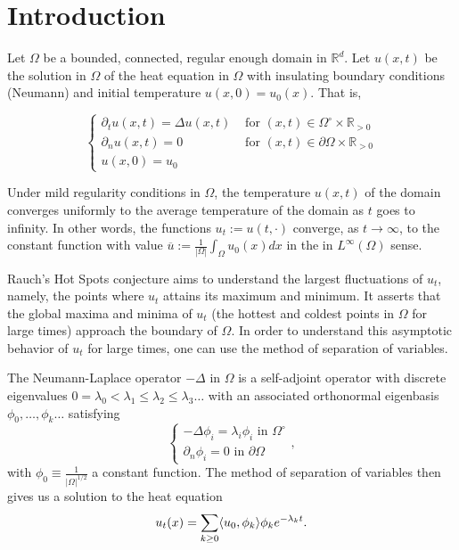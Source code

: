 \section{Introduction}

Let $\Omega$ be a bounded, connected, regular enough domain in $\mathbb R^d$. Let $u(x,t)$ be the solution in $\Omega$ of the heat equation in $\Omega$ with insulating boundary conditions (Neumann) and initial temperature $u(x,0)=u_0(x)$. That is,

\begin{equation}
    \begin{cases}
        \partial_t u(x,t) = \Delta u(x,t) & \text{ for } (x,t)\in \Omega^\circ\times \mathbb R_{>0}\\
        \partial_n u(x,t) = 0 &\text{ for } (x,t)\in \partial \Omega \times \mathbb R_{>0} \\
        u(x,0) = u_0
    \end{cases}
\end{equation}

Under mild regularity conditions in $\Omega$, the temperature $u(x,t)$ of the domain converges uniformly to the average temperature of the domain as $t$ goes to infinity. In other words, the functions $u_t:= u(t,\cdot)$ converge, as $t\to \infty$, to the constant function with value $\overline u:= \frac 1 {|\Omega|}\int_\Omega u_0(x) dx$ in the in $L^\infty(\Omega)$ sense.

Rauch's Hot Spots conjecture aims to understand the largest fluctuations of $u_t$, namely, the points where $u_t$ attains its maximum and minimum. It asserts that the global maxima and minima of $u_t$ (the hottest and coldest points in $\Omega$ for large times) approach the boundary of $\Omega$.  In order to understand this asymptotic behavior of $u_t$ for large times, one can use the method of separation of variables. 

The Neumann-Laplace operator $-\Delta$ in $\Omega$ is a self-adjoint operator with discrete eigenvalues $0= \lambda_0<\lambda_1 \le\lambda_2\le \lambda_3 \dots$ with an associated orthonormal eigenbasis $\phi_0, \dots, \phi_k\dots$ satisfying 
\begin{equation}
    \begin{cases}
        -\Delta \phi_i = \lambda_i \phi_i \text{ in } \Omega^\circ \\
        \partial_n \phi_i = 0 \text{ in }\partial \Omega
    \end{cases},
\end{equation}
with $\phi_0\equiv \frac{1}{|\Omega|^{1/2}}$ a constant function. The method of separation of variables then gives us a solution to the heat equation $$u_t(x) = \sum_{k \ge 0} \langle u_0, \phi_k \rangle\phi_k e^{-\lambda_k t}.$$


